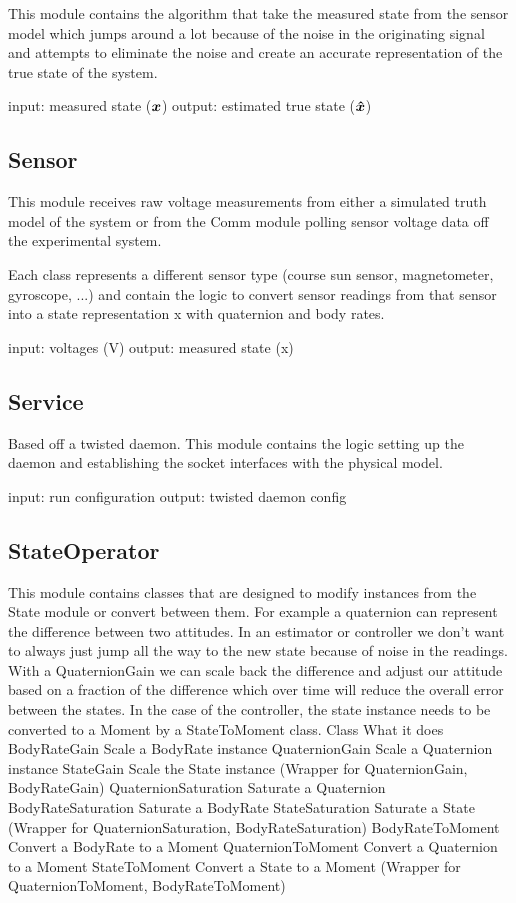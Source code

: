 This module contains the algorithm that take the measured state from the sensor model which jumps around a lot because of the noise in the originating signal and attempts to eliminate the noise and create an accurate representation of the true state of the system.

    input: measured state ($\boldsymbol{x}$)
    output: estimated true state ($\boldsymbol{\hat{x}}$)

\subsection{Sensor}
\label{subsec:Sensor}


This module receives raw voltage measurements from either a simulated truth model of the system or from the Comm module polling sensor voltage data off the experimental system.

Each class represents a different sensor type (course sun sensor, magnetometer, gyroscope, ...) and contain the logic to convert sensor readings from that sensor into a state representation x with quaternion and body rates.

    input: voltages (V)
    output: measured state (x)

\subsection{Service}
\label{subsec:Service}


Based off a twisted daemon. This module contains the logic setting up the daemon and establishing the socket interfaces with the physical model.

    input: run configuration
    output: twisted daemon config

\subsection{StateOperator}
\label{subsec:StateOperator}

This module contains classes that are designed to modify instances from the State module or convert between them. For example a quaternion can represent the difference between two attitudes. In an estimator or controller we don't want to always just jump all the way to the new state because of noise in the readings. With a QuaternionGain we can scale back the difference and adjust our attitude based on a fraction of the difference which over time will reduce the overall error between the states. In the case of the controller, the state instance needs to be converted to a Moment by a StateToMoment class.
Class   What it does
BodyRateGain  Scale a BodyRate instance
QuaternionGain  Scale a Quaternion instance
StateGain   Scale the State instance (Wrapper for QuaternionGain, BodyRateGain)
QuaternionSaturation  Saturate a Quaternion
BodyRateSaturation  Saturate a BodyRate
StateSaturation   Saturate a State (Wrapper for QuaternionSaturation, BodyRateSaturation)
BodyRateToMoment  Convert a BodyRate to a Moment
QuaternionToMoment  Convert a Quaternion to a Moment
StateToMoment   Convert a State to a Moment (Wrapper for QuaternionToMoment, BodyRateToMoment)

